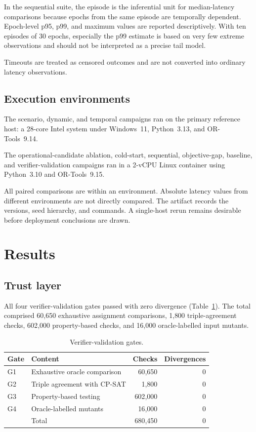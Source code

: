\documentclass[pdflatex,sn-mathphys-num,iicol,oneside]{sn-jnl}
\newcommand{\cpsat}{\textsc{CP-SAT}\xspace}
\begin{document}
In the sequential suite, the episode is the inferential unit for
median-latency comparisons because epochs from the same episode are
temporally dependent. Epoch-level p95, p99, and maximum values are
reported descriptively. With ten episodes of 30 epochs, especially
the p99 estimate is based on very few extreme observations and should
not be interpreted as a precise tail model.

Timeouts are treated as censored outcomes and are not converted into
ordinary latency observations.

\subsection{Execution environments}

The scenario, dynamic, and temporal campaigns ran on the primary
reference host: a 28-core Intel system under Windows~11, Python~3.13,
and OR-Tools~9.14.

The operational-candidate ablation, cold-start, sequential,
objective-gap, baseline, and verifier-validation campaigns ran in a
2-vCPU Linux container using Python~3.10 and OR-Tools~9.15.

All paired comparisons are within an environment. Absolute latency
values from different environments are not directly compared. The
artifact records the versions, seed hierarchy, and commands. A
single-host rerun remains desirable before deployment conclusions are
drawn.

\section{Results}
\label{sec:results}

\subsection{Trust layer}

All four verifier-validation gates passed with zero divergence
(Table~\ref{tab:gates}). The total comprised 60{,}650 exhaustive
assignment comparisons, 1{,}800 triple-agreement checks, 602{,}000
property-based checks, and 16{,}000 oracle-labelled input mutants.

\begin{table}[t]
\centering
\caption{Verifier-validation gates.}
\label{tab:gates}
\setlength{\tabcolsep}{4pt}
\small

\begin{tabular}{llrr}
\toprule
Gate & Content & Checks & Divergences\\
\midrule
G1 & Exhaustive oracle comparison & 60{,}650 & 0\\
G2 & Triple agreement with \cpsat & 1{,}800 & 0\\
G3 & Property-based testing & 602{,}000 & 0\\
G4 & Oracle-labelled mutants & 16{,}000 & 0\\
\midrule
& Total & 680{,}450 & 0\\
\bottomrule
\end{tabular}
\end{table}
\end{document}
